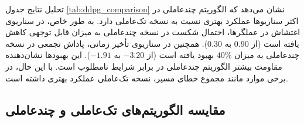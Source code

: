 تحلیل نتایج جدول \ref{tab:ddpg_comparison} نشان می‌دهد که الگوریتم چندعاملی  در اکثر سناریوها عملکرد بهتری نسبت به نسخه تک‌عاملی دارد. به طور خاص، در سناریوی اغتشاش در عملگرها، احتمال شکست در نسخه چندعاملی به میزان قابل توجهی کاهش یافته است (از $0.90$ به $0.30$). همچنین در سناریوی تأخیر زمانی، پاداش تجمعی در نسخه چندعاملی به میزان $40\%$ بهبود یافته است (از $-3.20$ به $-1.91$). این بهبودها نشان‌دهنده مقاومت بیشتر الگوریتم چندعاملی در برابر شرایط نامطلوب است. با این حال، در برخی موارد مانند مجموع خطای مسیر، نسخه تک‌عاملی عملکرد بهتری داشته است.

\subsection{مقایسه الگوریتم‌های تک‌عاملی و چندعاملی }

